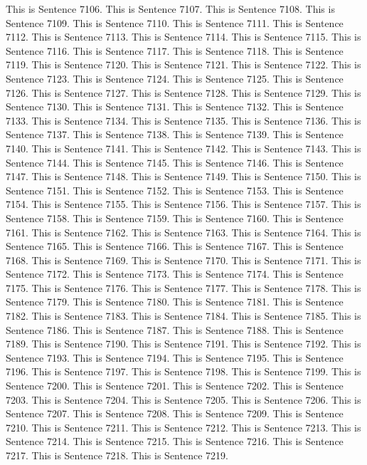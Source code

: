 \documentclass{article}
\begin{document}
This is Sentence 7106.
This is Sentence 7107.
This is Sentence 7108.
This is Sentence 7109.
This is Sentence 7110.
This is Sentence 7111.
This is Sentence 7112.
This is Sentence 7113.
This is Sentence 7114.
This is Sentence 7115.
This is Sentence 7116.
This is Sentence 7117.
This is Sentence 7118.
This is Sentence 7119.
This is Sentence 7120.
This is Sentence 7121.
This is Sentence 7122.
This is Sentence 7123.
This is Sentence 7124.
This is Sentence 7125.
This is Sentence 7126.
This is Sentence 7127.
This is Sentence 7128.
This is Sentence 7129.
This is Sentence 7130.
This is Sentence 7131.
This is Sentence 7132.
This is Sentence 7133.
This is Sentence 7134.
This is Sentence 7135.
This is Sentence 7136.
This is Sentence 7137.
This is Sentence 7138.
This is Sentence 7139.
This is Sentence 7140.
This is Sentence 7141.
This is Sentence 7142.
This is Sentence 7143.
This is Sentence 7144.
This is Sentence 7145.
This is Sentence 7146.
This is Sentence 7147.
This is Sentence 7148.
This is Sentence 7149.
This is Sentence 7150.
This is Sentence 7151.
This is Sentence 7152.
This is Sentence 7153.
This is Sentence 7154.
This is Sentence 7155.
This is Sentence 7156.
This is Sentence 7157.
This is Sentence 7158.
This is Sentence 7159.
This is Sentence 7160.
This is Sentence 7161.
This is Sentence 7162.
This is Sentence 7163.
This is Sentence 7164.
This is Sentence 7165.
This is Sentence 7166.
This is Sentence 7167.
This is Sentence 7168.
This is Sentence 7169.
This is Sentence 7170.
This is Sentence 7171.
This is Sentence 7172.
This is Sentence 7173.
This is Sentence 7174.
This is Sentence 7175.
This is Sentence 7176.
This is Sentence 7177.
This is Sentence 7178.
This is Sentence 7179.
This is Sentence 7180.
This is Sentence 7181.
This is Sentence 7182.
This is Sentence 7183.
This is Sentence 7184.
This is Sentence 7185.
This is Sentence 7186.
This is Sentence 7187.
This is Sentence 7188.
This is Sentence 7189.
This is Sentence 7190.
This is Sentence 7191.
This is Sentence 7192.
This is Sentence 7193.
This is Sentence 7194.
This is Sentence 7195.
This is Sentence 7196.
This is Sentence 7197.
This is Sentence 7198.
This is Sentence 7199.
This is Sentence 7200.
This is Sentence 7201.
This is Sentence 7202.
This is Sentence 7203.
This is Sentence 7204.
This is Sentence 7205.
This is Sentence 7206.
This is Sentence 7207.
This is Sentence 7208.
This is Sentence 7209.
This is Sentence 7210.
This is Sentence 7211.
This is Sentence 7212.
This is Sentence 7213.
This is Sentence 7214.
This is Sentence 7215.
This is Sentence 7216.
This is Sentence 7217.
This is Sentence 7218.
This is Sentence 7219.
\end{document}
